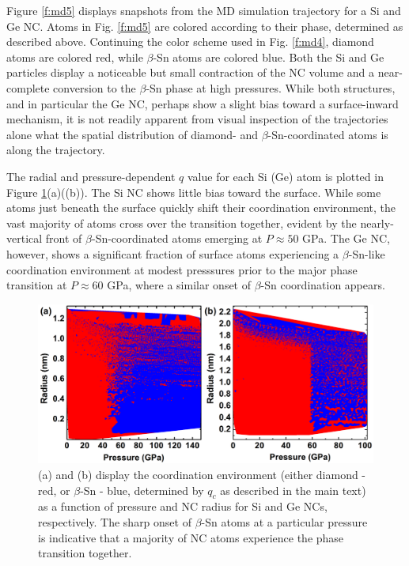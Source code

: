 Figure \ref{f:md5} displays snapshots from the MD simulation trajectory for a Si and Ge NC. Atoms in Fig. \ref{f:md5} are colored according to their phase, determined as described above. Continuing the color scheme used in Fig. \ref{f:md4}, diamond atoms are colored red, while $\beta$-Sn atoms are colored blue. Both the Si and Ge particles display a noticeable but small contraction of the NC volume and a near-complete conversion to the $\beta$-Sn phase at high pressures. While both structures, and in particular the Ge NC, perhaps show a slight bias toward a surface-inward mechanism, it is not readily apparent from visual inspection of the trajectories alone what the spatial distribution of diamond- and $\beta$-Sn-coordinated atoms is along the trajectory.\par
The radial and pressure-dependent $q$ value for each Si (Ge) atom is plotted in Figure \ref{f:md6}(a)((b)). The Si NC shows little bias toward the surface.  While some atoms just beneath the surface quickly shift their coordination environment, the vast majority of atoms cross over the transition together, evident by the nearly-vertical front of $\beta$-Sn-coordinated atoms emerging at $P \approx 50$ GPa. The Ge NC, however, shows a significant fraction of surface atoms experiencing a $\beta$-Sn-like coordination environment at modest presssures prior to the major phase transition at $P \approx 60$ GPa, where a similar onset of $\beta$-Sn coordination appears. 

\begin{figure}
\begin{center}
\includegraphics[width=\textwidth]{./chapter7/md6.png}
\caption[Dependence of atomic coordination on radius and pressure during MD simulations of NC pressurization.]{(a) and (b) display the coordination environment (either diamond - red, or $\beta$-Sn - blue, determined by $q_c$ as described in the main text) as a function of pressure and NC radius for Si and Ge NCs, respectively. The sharp onset of $\beta$-Sn atoms at a particular pressure is indicative that a majority of NC atoms experience the phase transition together.}
\label{f:md6}
\end{center}
\end{figure}

